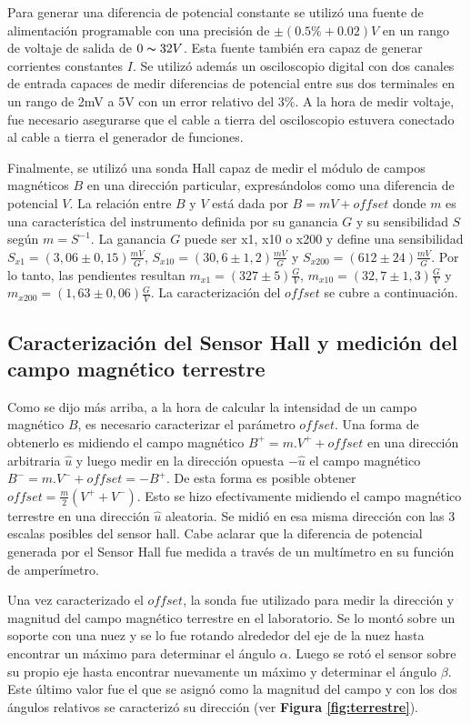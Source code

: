 \documentclass[11pt,a4paper]{article}
\begin{document}
Para generar una diferencia de potencial constante se utilizó una fuente de alimentación programable con una precisión de $\pm (0.5\% + 0.02)V$ en un rango de voltaje de salida de $0 \thicksim 32 V$. Esta fuente también era capaz de generar corrientes constantes $I$. Se utilizó además un osciloscopio digital con dos canales de entrada capaces de medir diferencias de potencial entre sus dos terminales en un rango de 2mV a 5V con un error relativo del $3\%$. A la hora de medir voltaje, fue necesario asegurarse que el cable a tierra del osciloscopio estuvera conectado al cable a tierra el generador de funciones. 

Finalmente, se utilizó una sonda Hall capaz de medir el módulo de campos magnéticos $B$ en una dirección particular, expresándolos como una diferencia de potencial $V$. La relación entre $B$ y $V$ está dada por $B = mV+offset$ donde $m$ es una característica del instrumento definida por su ganancia $G$ y su sensibilidad $S$ según $m = S^{-1}$. La ganancia $G$ puede ser x1, x10 o x200 y define una sensibilidad $S_{x1} = (3,06 \pm 0,15)\frac{mV}{G}$,  $S_{x10} = (30,6 \pm 1,2)\frac{mV}{G}$ y $S_{x200} = (612 \pm 24)\frac{mV}{G}$. Por lo tanto, las pendientes resultan $m_{x1} = (327 \pm 5)\frac{G}{V}$, $m_{x10} = (32,7 \pm 1,3)\frac{G}{V}$ y $m_{x200} = (1,63 \pm 0,06)\frac{G}{V}$. La caracterización del $offset$ se cubre a continuación.

\subsection{Caracterización del Sensor Hall y medición del campo magnético terrestre}

Como se dijo más arriba, a la hora de calcular la intensidad de un campo magnético $B$, es necesario caracterizar el parámetro $offset$. Una forma de obtenerlo es midiendo el campo magnético $B^{+} = m.V^{+}+offset$ en una dirección arbitraria $\widehat{u}$ y luego medir en la dirección opuesta $-\widehat{u}$ el campo magnético $B^{-} = m.V^{-}+offset=-B^{+}$. De esta forma es posible obtener $offset = \frac{m}{2}(V^{+}+V^{-})$. Esto se hizo efectivamente midiendo el campo magnético terrestre en una dirección $\widehat{u}$ aleatoria. Se midió en esa misma dirección con las 3 escalas posibles del sensor hall. Cabe aclarar que la diferencia de potencial generada por el Sensor Hall fue medida a través de un multímetro en su función de amperímetro.

Una vez caracterizado el $offset$, la sonda fue utilizado para medir la dirección y magnitud del campo magnético terrestre en el laboratorio. Se lo montó sobre un soporte con una nuez y se lo fue rotando alrededor del eje de la nuez hasta encontrar un máximo para determinar el ángulo $\alpha$. Luego se rotó el sensor sobre su propio eje hasta encontrar nuevamente un máximo y determinar el ángulo $\beta$. Este último valor fue el que se asignó como la magnitud del campo y con los dos ángulos relativos se caracterizó su dirección (ver \textbf{Figura \ref{fig:terrestre}}).
\end{document}
